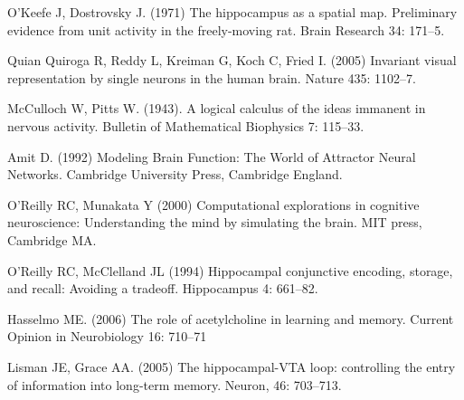 \documentclass[11pt,a4paper]{scrartcl}
\begin{document}
\begin{thebibliography}{10}

O'Keefe J, Dostrovsky J. (1971) The hippocampus as a spatial map. Preliminary evidence from unit activity in the freely-moving rat.
\newblock Brain Research 34: 171--5.

Quian Quiroga R, Reddy L, Kreiman G, Koch C, Fried I. (2005) Invariant visual representation by single neurons in the human brain.
\newblock Nature 435: 1102--7.

McCulloch W, Pitts W. (1943). A logical calculus of the ideas immanent in nervous activity. 
\newblock Bulletin of Mathematical Biophysics 7: 115--33.

 Amit D. (1992) Modeling Brain Function: The World
  of Attractor Neural Networks.
\newblock Cambridge University Press, Cambridge England.

O'Reilly RC, Munakata Y (2000) Computational explorations in cognitive neuroscience: Understanding the mind by simulating the brain.
\newblock MIT press, Cambridge MA.

O’Reilly RC, McClelland JL (1994) Hippocampal conjunctive encoding, storage, and recall: Avoiding a tradeoff.
\newblock Hippocampus 4: 661--82.

Hasselmo ME. (2006) The role of acetylcholine in learning and memory.
\newblock Current Opinion in Neurobiology 16: 710--71

Lisman JE, Grace AA. (2005) The hippocampal-VTA loop: controlling the entry of information into long-term memory.
\newblock Neuron, 46: 703--713.

\end{thebibliography}
\end{document}
